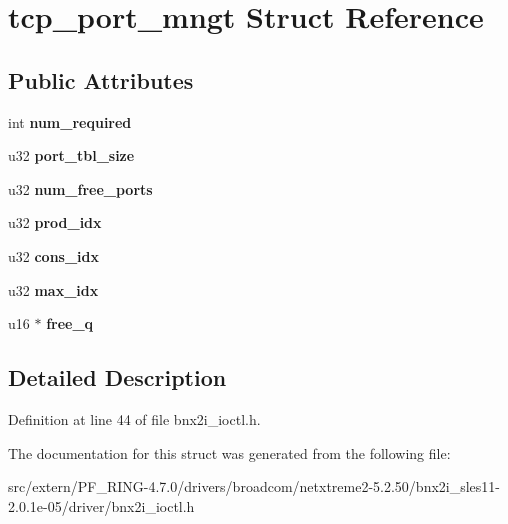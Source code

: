 \hypertarget{structtcp__port__mngt}{
\section{tcp\_\-port\_\-mngt Struct Reference}
\label{structtcp__port__mngt}
}
\subsection*{Public Attributes}
\begin{DoxyCompactItemize}
\item 
\hypertarget{structtcp__port__mngt_ac732674d5870116c64f0a15a6cb5e602}{
int {\bfseries num\_\-required}}
\label{structtcp__port__mngt_ac732674d5870116c64f0a15a6cb5e602}

\item 
\hypertarget{structtcp__port__mngt_ab34eaed4ddb547cefefc1feb6a63d359}{
u32 {\bfseries port\_\-tbl\_\-size}}
\label{structtcp__port__mngt_ab34eaed4ddb547cefefc1feb6a63d359}

\item 
\hypertarget{structtcp__port__mngt_a08c2ed9375895e4736691acf98b7b0bf}{
u32 {\bfseries num\_\-free\_\-ports}}
\label{structtcp__port__mngt_a08c2ed9375895e4736691acf98b7b0bf}

\item 
\hypertarget{structtcp__port__mngt_a6e42f7c4d340b7e49c5c7b3f1905b7eb}{
u32 {\bfseries prod\_\-idx}}
\label{structtcp__port__mngt_a6e42f7c4d340b7e49c5c7b3f1905b7eb}

\item 
\hypertarget{structtcp__port__mngt_a2a5ceb7d2514bca386d8586c7eb62e36}{
u32 {\bfseries cons\_\-idx}}
\label{structtcp__port__mngt_a2a5ceb7d2514bca386d8586c7eb62e36}

\item 
\hypertarget{structtcp__port__mngt_a6309b8b20e745e4a37fe7af66c3c8cd9}{
u32 {\bfseries max\_\-idx}}
\label{structtcp__port__mngt_a6309b8b20e745e4a37fe7af66c3c8cd9}

\item 
\hypertarget{structtcp__port__mngt_a19de26954cfcfc3f313f218ad1998c15}{
u16 $\ast$ {\bfseries free\_\-q}}
\label{structtcp__port__mngt_a19de26954cfcfc3f313f218ad1998c15}

\end{DoxyCompactItemize}


\subsection{Detailed Description}


Definition at line 44 of file bnx2i\_\-ioctl.h.



The documentation for this struct was generated from the following file:\begin{DoxyCompactItemize}
\item 
src/extern/PF\_\-RING-\/4.7.0/drivers/broadcom/netxtreme2-\/5.2.50/bnx2i\_\-sles11-\/2.0.1e-\/05/driver/bnx2i\_\-ioctl.h\end{DoxyCompactItemize}
